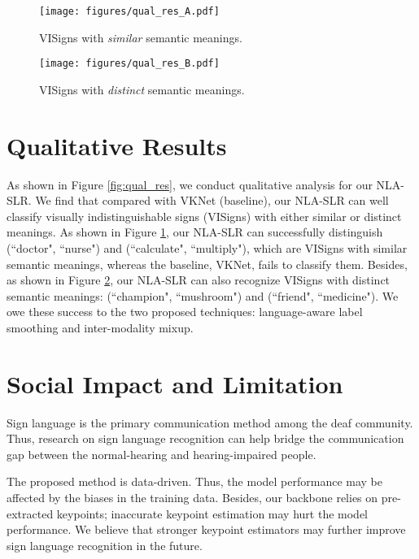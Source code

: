 \documentclass[10pt,twocolumn,letterpaper]{article}
\begin{document}
\begin{figure*}[t]
     \centering
     \begin{subfigure}[t]{0.95\textwidth}
         \centering
         \texttt{[image: figures/qual\_res\_A.pdf]}
         \caption{VISigns with \textit{similar} semantic meanings.}
         \label{fig:qual_res_A}
     \end{subfigure}

     \begin{subfigure}[t]{0.95\textwidth}
         \centering
         \texttt{[image: figures/qual\_res\_B.pdf]}
         \caption{VISigns with \textit{distinct} semantic meanings.}
         \label{fig:qual_res_B}
     \end{subfigure}

\caption{Qualitative results on WLASL2000. (Here for NLA-SLR, we do not use intra-modality mixup for a fair comparison. The ground-truth gloss is highlighted in \textcolor{red}{red}.)}
\label{fig:qual_res}
\end{figure*}





\section{Qualitative Results}
As shown in Figure \ref{fig:qual_res}, we conduct qualitative analysis for our NLA-SLR.
We find that compared with VKNet (baseline), our NLA-SLR can well classify visually indistinguishable signs (VISigns) with either similar or distinct meanings. 
As shown in Figure \ref{fig:qual_res_A}, our NLA-SLR can successfully distinguish (``doctor", ``nurse") and (``calculate", ``multiply"), which are VISigns with similar semantic meanings, whereas the baseline, VKNet, fails to classify them.
Besides, as shown in Figure \ref{fig:qual_res_B}, our NLA-SLR can also recognize VISigns with distinct semantic meanings: (``champion", ``mushroom") and (``friend", ``medicine").
We owe these success to the two proposed techniques: language-aware label smoothing and inter-modality mixup.


\section{Social Impact and Limitation}
Sign language is the primary communication method among the deaf community.
Thus, research on sign language recognition can help bridge the communication gap between the normal-hearing and hearing-impaired people.

The proposed method is data-driven.
Thus, the model performance may be affected by the biases in the training data.
Besides, our backbone relies on pre-extracted keypoints; inaccurate keypoint estimation may hurt the model performance.
We believe that stronger keypoint estimators may further improve sign language recognition in the future. 
\end{document}
